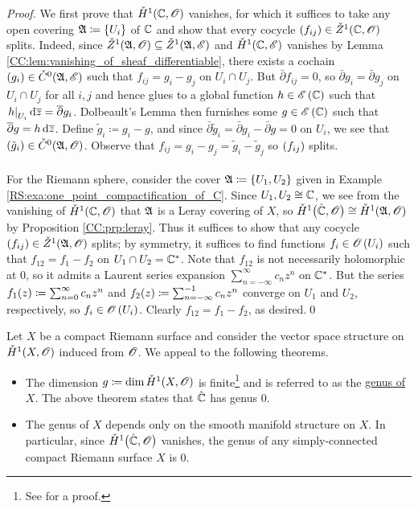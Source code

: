 \documentclass[../Moduli_Spaces_of_Riemann_Surfaces.tex]{subfiles}
\begin{document}
    \begin{proof}
        We first prove that $\check{H}^1\!\left(\mathbb{C},\mathscr{O}\right)$ vanishes, for which it suffices to take any open covering $\mathfrak{A}\coloneqq\left\{U_i\right\}$ of $\mathbb{C}$ and show that every cocycle $\left(f_{ij}\right)\in\check{Z}^1\!\left(\mathbb{C},\mathscr{O}\right)$ splits. Indeed, since $\check{Z}^1\!\left(\mathfrak{A},\mathscr{O}\right)\subseteq\check{Z}^1\!\left(\mathfrak{A},\mathscr{E}\right)$ and $\check{H}^1\!\left(\mathbb{C},\mathscr{E}\right)$ vanishes by Lemma \ref{CC:lem:vanishing_of_sheaf_differentiable}, there exists a cochain $\left(g_i\right)\in\check{C}^0\!\left(\mathfrak{A},\mathscr{E}\right)$ such that $f_{ij}=g_i-g_j$ on $U_i\cap U_j$. But $\bar{\partial}f_{ij}=0$, so $\bar{\partial}g_i=\bar{\partial}g_j$ on $U_i\cap U_j$ for all $i,j$ and hence glues to a global function $h\in\mathscr{E}\left(\mathbb{C}\right)$ such that $\left.h\right|_{U_i}\mathrm{d}\overline{z}=\overline{\partial}g_i$. Dolbeault's Lemma then furnishes some $g\in\mathscr{E}\left(\mathbb{C}\right)$ such that $\overline{\partial}g=h\,\mathrm{d}\overline{z}$. Define $\tilde{g}_i\coloneqq g_i-g$, and since $\bar{\partial}\tilde{g}_i=\bar{\partial} g_i-\bar{\partial}g=0$ on $U_i$, we see that $\left(\tilde{g}_i\right)\in\check{C}^0\!\left(\mathfrak{A},\mathscr{O}\right)$. Observe that $f_{ij}=g_i-g_j=\tilde{g}_i-\tilde{g}_j$ so $\left(f_{ij}\right)$ splits.\\\ \\
        For the Riemann sphere, consider the cover $\mathfrak{A}\coloneqq\left\{U_1,U_2\right\}$ given in Example \ref{RS:exa:one_point_compactification_of_C}. Since $U_1,U_2\cong\mathbb{C}$, we see from the vanishing of $\check{H}^1\!\left(\mathbb{C},\mathscr{O}\right)$ that $\mathfrak{A}$ is a Leray covering of $X$, so $\check{H}^1\big(\hat{\mathbb{C}},\mathscr{O}\big)\cong\check{H}^1\!\left(\mathfrak{A},\mathscr{O}\right)$ by Proposition \ref{CC:prp:leray}. Thus it suffices to show that any cocycle $\left(f_{ij}\right)\in\check{Z}^1\!\left(\mathfrak{A},\mathscr{O}\right)$ splits; by symmetry, it suffices to find functions $f_i\in\mathscr{O}\left(U_i\right)$ such that $f_{12}=f_1-f_2$ on $U_1\cap U_2=\mathbb{C}^\ast$. Note that $f_{12}$ is not necessarily holomorphic at $0$, so it admits a Laurent series expansion $\sum_{n=-\infty}^{\infty}c_nz^n$ on $\mathbb{C}^\ast$. But the series $f_1\!\left(z\right)\coloneqq\sum_{n=0}^{\infty}c_nz^n$ and $f_2\!\left(z\right)\coloneqq\sum_{n=-\infty}^{-1}c_nz^n$ converge on $U_1$ and $U_2$, respectively, so $f_i\in\mathscr{O}\left(U_i\right)$. Clearly $f_{12}=f_1-f_2$, as desired.\qed
    \end{proof}
    \begin{remark}
        Let $X$ be a compact Riemann surface and consider the vector space structure on $\check{H}^1\!\left(X,\mathscr{O}\right)$ induced from $\mathscr{O}$. We appeal to the following theorems.
        \begin{itemize}
            \item The dimension $g\coloneqq\dim\check{H}^1\!\left(X,\mathscr{O}\right)$ is finite\footnote{See \cite[][Section 14]{forster} for a proof.} and is referred to as the \ul{genus of $X$}. The above theorem states that $\hat{\mathbb{C}}$ has genus $0$.
                \vspace{-0.05in}
            \item The genus of $X$ depends only on the smooth manifold structure on $X$. In particular, since $\check{H}^1\big(\hat{\mathbb{C}},\mathscr{O}\big)$ vanishes, the genus of any simply-connected compact Riemann surface $X$ is $0$.\exqed
        \end{itemize}
    \end{remark}
\end{document}
